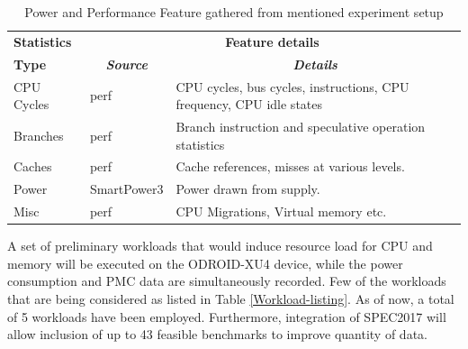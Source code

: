 \documentclass[conference]{IEEEtran}
\begin{document}
        \begin{table}[htbp]
            \caption{Power and Performance Feature gathered from mentioned experiment setup}
            \begin{center}
                \begin{tabular}{|p{1.6cm}|p{1.9cm}|p{3.6cm}|}
                    \hline
                    \textbf{Statistics}&\multicolumn{2}{|c|}{\textbf{Feature details}} \\
                    \cline{2-3} 
                    \textbf{Type} & \multicolumn{1}{|c|}{\textbf{\textit{Source}}} & \multicolumn{1}{|c|}{\textbf{\textit{Details}}} \\
                    \hline
                    CPU Cycles  & perf\cite{2015137}  & CPU cycles, bus cycles, instructions, CPU frequency, CPU idle states \\
                    \hline
                    Branches  & perf & Branch instruction and speculative operation statistics \\
                    \hline
                    Caches   & perf  &  Cache references, misses at various levels. \\
                    \hline
                    Power & SmartPower3\cite{odroid-smartpower3} &  Power drawn from supply. \\
                    \hline
                    Misc & perf  & CPU Migrations, Virtual memory etc. \\
                    \hline
                \end{tabular}
                \label{Power-Perf-data-gathered}
            \end{center}
        \end{table}

        \par A set of preliminary workloads that would induce resource load for CPU and memory will be executed on the ODROID-XU4 device, while the power consumption and PMC data are simultaneously recorded. Few of the workloads that are being considered as listed in Table \ref{Workload-listing}. As of now, a total of 5 workloads have been employed. Furthermore, integration of SPEC2017 will allow inclusion of up to 43 feasible benchmarks to improve quantity of data.
\end{document}
